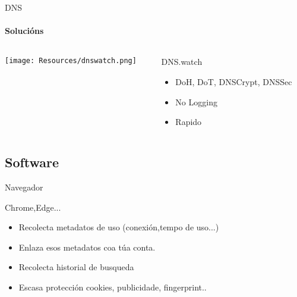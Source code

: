 \documentclass{beamer}
\begin{document}
\begin{frame}{DNS}
  \framesubtitle{Solucións}

  \begin{columns}
    \begin{column}{0.5\textwidth}
      \texttt{[image: Resources/dnswatch.png]}

      \vspace{1cm}


    \end{column}

    \begin{column}{0.4\textwidth}
      \begin{block}{DNS.watch}
        \begin{itemize}
          \item DoH, DoT, DNSCrypt, DNSSec
          \item No Logging
          \item Rapido
        \end{itemize}
      \end{block}

    \end{column}

  \end{columns}


\end{frame}


\subsection{Software}

\begin{frame}{Navegador}
  \subtitle{Problema}

  \begin{block}{Chrome,Edge...}

    \begin{itemize}
      \item Recolecta metadatos de uso (conexión,tempo de uso...)
      \item Enlaza esos metadatos coa túa conta.
      \item Recolecta historial de busqueda
      \item Escasa protección cookies, publicidade, fingerprint..
    \end{itemize}

  \end{block}

\end{frame}
\end{document}
